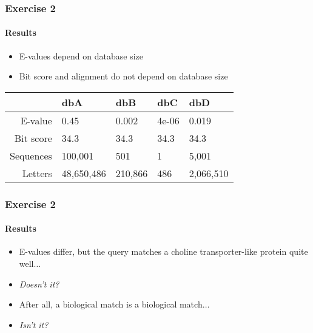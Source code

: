 \begin{frame}
  \frametitle{Exercise 2}
  \framesubtitle{Results}
  \begin{itemize}
    \item E-values depend on database size
    \item Bit score and alignment do not depend on database size
  \end{itemize}
  \begin{center}
  \begin{tabular}{r|l|l|l|l}
	   & dbA & dbB & dbC & dbD \\
	  \hline
	  \hline
	  E-value & 0.45 & 0.002 & 4e-06 & 0.019 \\
	  Bit score & 34.3 & 34.3 & 34.3 & 34.3 \\
	  \hline
	  Sequences & 100,001 & 501 & 1 & 5,001 \\
	  Letters & 48,650,486 & 210,866 & 486 & 2,066,510 	  
  \end{tabular}
  \end{center}
\end{frame}

\begin{frame}
  \frametitle{Exercise 2}
  \framesubtitle{Results}    
  \begin{itemize}
    \item<1-> E-values differ, but the query matches a choline transporter-like 
protein quite well$\ldots$
    \item<2-> \emph{Doesn't it?}
    \item<1-> After all, a biological match is a biological match$\ldots$
    \item<2-> \emph{Isn't it?}
  \end{itemize}
\end{frame}

